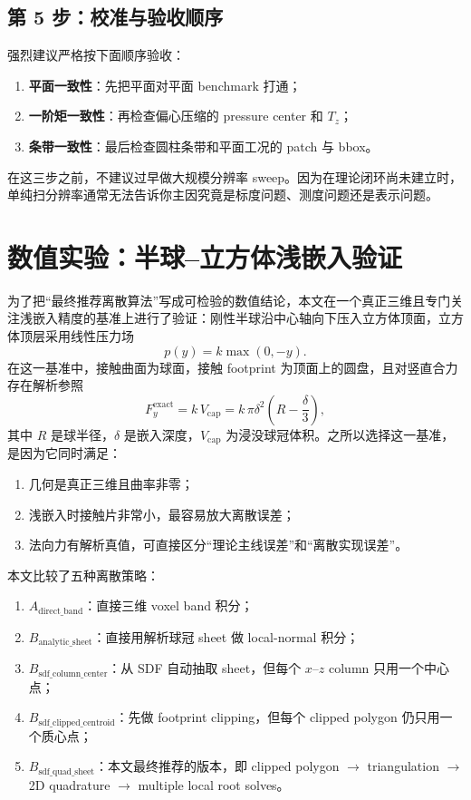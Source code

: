 \documentclass[12pt,a4paper]{ctexart}
\begin{document}
\subsection{第 5 步：校准与验收顺序}
强烈建议严格按下面顺序验收：
\begin{enumerate}
    \item \textbf{平面一致性}：先把平面对平面 benchmark 打通；
    \item \textbf{一阶矩一致性}：再检查偏心压缩的 pressure center 和 $T_z$；
    \item \textbf{条带一致性}：最后检查圆柱条带和平面工况的 patch 与 bbox。
\end{enumerate}

在这三步之前，不建议过早做大规模分辨率 sweep。因为在理论闭环尚未建立时，单纯扫分辨率通常无法告诉你主因究竟是标度问题、测度问题还是表示问题。

\section{数值实验：半球--立方体浅嵌入验证}

为了把“最终推荐离散算法”写成可检验的数值结论，本文在一个真正三维且专门关注浅嵌入精度的基准上进行了验证：刚性半球沿中心轴向下压入立方体顶面，立方体顶层采用线性压力场
\begin{equation}
    p(y)=k\max(0,-y).
\end{equation}
在这一基准中，接触曲面为球面，接触 footprint 为顶面上的圆盘，且对竖直合力存在解析参照
\begin{equation}
    F_y^{\mathrm{exact}} = k\,V_{\mathrm{cap}} = k\,\pi\delta^2\left(R-\frac{\delta}{3}\right),
\end{equation}
其中 $R$ 是球半径，$\delta$ 是嵌入深度，$V_{\mathrm{cap}}$ 为浸没球冠体积。之所以选择这一基准，是因为它同时满足：
\begin{enumerate}
    \item 几何是真正三维且曲率非零；
    \item 浅嵌入时接触片非常小，最容易放大离散误差；
    \item 法向力有解析真值，可直接区分“理论主线误差”和“离散实现误差”。
\end{enumerate}

本文比较了五种离散策略：
\begin{enumerate}
    \item $A_{\mathrm{direct\_band}}$：直接三维 voxel band 积分；
    \item $B_{\mathrm{analytic\_sheet}}$：直接用解析球冠 sheet 做 local-normal 积分；
    \item $B_{\mathrm{sdf\_column\_center}}$：从 SDF 自动抽取 sheet，但每个 $x$--$z$ column 只用一个中心点；
    \item $B_{\mathrm{sdf\_clipped\_centroid}}$：先做 footprint clipping，但每个 clipped polygon 仍只用一个质心点；
    \item $B_{\mathrm{sdf\_quad\_sheet}}$：本文最终推荐的版本，即 clipped polygon $\to$ triangulation $\to$ 2D quadrature $\to$ multiple local root solves。
\end{enumerate}
\end{document}
